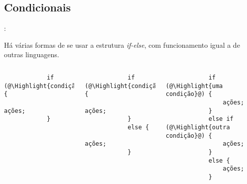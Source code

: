 %
%
%
%
%
%


\subsection{Condicionais}


\begin{frame}[fragile]{\insertsection: \insertsubsection}

	Há várias formas de se usar a estrutura \emph{if-else}, com funcionamento igual a de outras linguagens.
	\begin{columns}[t]
		\begin{verbatim}
			if (@\Highlight{condição}@) {
				ações;
			}
		\end{verbatim}

		\begin{verbatim}
			if (@\Highlight{condição}@) {
				ações;
			}
			else {
				ações;
			}
		\end{verbatim}

		\begin{verbatim}
			if (@\Highlight{uma condição}@) {
				ações;
			}
			else if (@\Highlight{outra condição}@) {
				ações;
			}
			else {
				ações;
			}
		\end{verbatim}
	\end{columns}

\end{frame}


